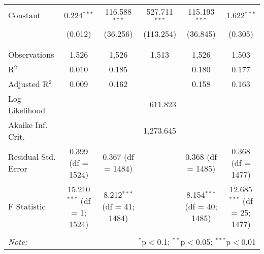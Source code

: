 \documentclass{article}
\begin{document}
\begin{table}[!htbp]
{\begin{tabular}{@{\extracolsep{5pt}}lccccc}
 Constant & 0.224$^{***}$ & 116.588$^{***}$ & 527.711$^{***}$ & 115.193$^{***}$ & 1.622$^{***}$ \\ 
  & (0.012) & (36.256) & (113.254) & (36.845) & (0.305) \\ 
  & & & & & \\ 
\hline \\[-1.8ex] 
Observations & 1,526 & 1,526 & 1,513 & 1,526 & 1,503 \\ 
R$^{2}$ & 0.010 & 0.185 &  & 0.180 & 0.177 \\ 
Adjusted R$^{2}$ & 0.009 & 0.162 &  & 0.158 & 0.163 \\ 
Log Likelihood &  &  & $-$611.823 &  &  \\ 
Akaike Inf. Crit. &  &  & 1,273.645 &  &  \\ 
Residual Std. Error & 0.399 (df = 1524) & 0.367 (df = 1484) &  & 0.368 (df = 1485) & 0.368 (df = 1477) \\ 
F Statistic & 15.210$^{***}$ (df = 1; 1524) & 8.212$^{***}$ (df = 41; 1484) &  & 8.154$^{***}$ (df = 40; 1485) & 12.685$^{***}$ (df = 25; 1477) \\ 
\hline 
\hline \\[-1.8ex] 
\textit{Note:}  & \multicolumn{5}{r}{$^{*}$p$<$0.1; $^{**}$p$<$0.05; $^{***}$p$<$0.01} \\ 
\end{tabular} }
\end{table} 
\end{document}

